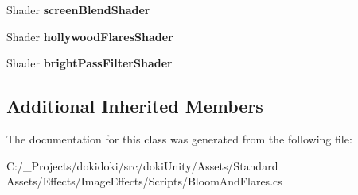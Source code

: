 \begin{DoxyCompactItemize}
\item 
Shader {\bfseries screen\+Blend\+Shader}\hypertarget{class_unity_standard_assets_1_1_image_effects_1_1_bloom_and_flares_a45562957df5a2f264e29f06327db7f8d}{}\label{class_unity_standard_assets_1_1_image_effects_1_1_bloom_and_flares_a45562957df5a2f264e29f06327db7f8d}

\item 
Shader {\bfseries hollywood\+Flares\+Shader}\hypertarget{class_unity_standard_assets_1_1_image_effects_1_1_bloom_and_flares_a2519d0a2e96c101627135d63a802264f}{}\label{class_unity_standard_assets_1_1_image_effects_1_1_bloom_and_flares_a2519d0a2e96c101627135d63a802264f}

\item 
Shader {\bfseries bright\+Pass\+Filter\+Shader}\hypertarget{class_unity_standard_assets_1_1_image_effects_1_1_bloom_and_flares_ab597f450e349400d9512bb5ce9acaf59}{}\label{class_unity_standard_assets_1_1_image_effects_1_1_bloom_and_flares_ab597f450e349400d9512bb5ce9acaf59}

\end{DoxyCompactItemize}
\subsection*{Additional Inherited Members}


The documentation for this class was generated from the following file\+:\begin{DoxyCompactItemize}
\item 
C\+:/\+\_\+\+Projects/dokidoki/src/doki\+Unity/\+Assets/\+Standard Assets/\+Effects/\+Image\+Effects/\+Scripts/Bloom\+And\+Flares.\+cs\end{DoxyCompactItemize}
